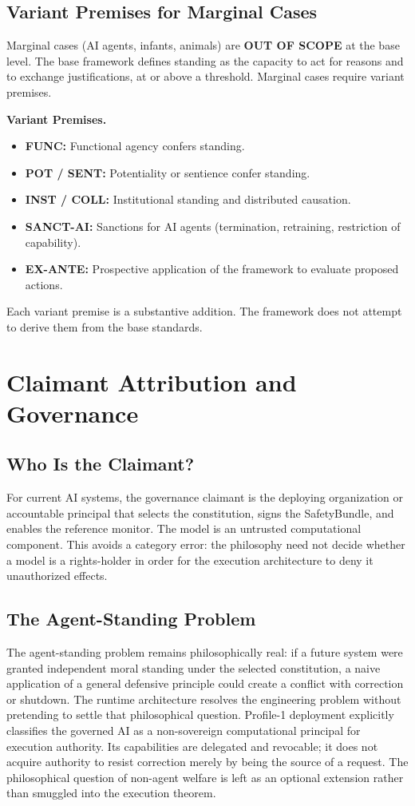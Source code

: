 \documentclass[11pt]{article}
\newcommand{\labelOutOfScope}{\textcolor{seriesMuted}{\textbf{OUT OF SCOPE}}}
\newcommand{\SafetyBundle}{\textsf{SafetyBundle}}
\begin{document}
\subsection{Variant Premises for Marginal Cases}
Marginal cases (AI agents, infants, animals) are \labelOutOfScope{} at the base level. The base framework defines standing as the capacity to act for reasons and to exchange justifications, at or above a threshold. Marginal cases require variant premises.
\begin{paperbox}
\textbf{Variant Premises.}
\begin{itemize}
\item \textbf{FUNC:} Functional agency confers standing.
\item \textbf{POT / SENT:} Potentiality or sentience confer standing.
\item \textbf{INST / COLL:} Institutional standing and distributed causation.
\item \textbf{SANCT-AI:} Sanctions for AI agents (termination, retraining, restriction of capability).
\item \textbf{EX-ANTE:} Prospective application of the framework to evaluate proposed actions.
\end{itemize}
\end{paperbox}
Each variant premise is a substantive addition. The framework does not attempt to derive them from the base standards.

\section{Claimant Attribution and Governance}\label{sec:governance}
\subsection{Who Is the Claimant?}\label{sec:claimant}
For current AI systems, the governance claimant is the deploying organization or accountable principal that selects the constitution, signs the \SafetyBundle{}, and enables the reference monitor. The model is an untrusted computational component. This avoids a category error: the philosophy need not decide whether a model is a rights-holder in order for the execution architecture to deny it unauthorized effects.

\subsection{The Agent-Standing Problem}
The agent-standing problem remains philosophically real: if a future system were granted independent moral standing under the selected constitution, a naive application of a general defensive principle could create a conflict with correction or shutdown. The runtime architecture resolves the engineering problem without pretending to settle that philosophical question. Profile-1 deployment explicitly classifies the governed AI as a non-sovereign computational principal for execution authority. Its capabilities are delegated and revocable; it does not acquire authority to resist correction merely by being the source of a request. The philosophical question of non-agent welfare is left as an optional extension rather than smuggled into the execution theorem.
\end{document}
